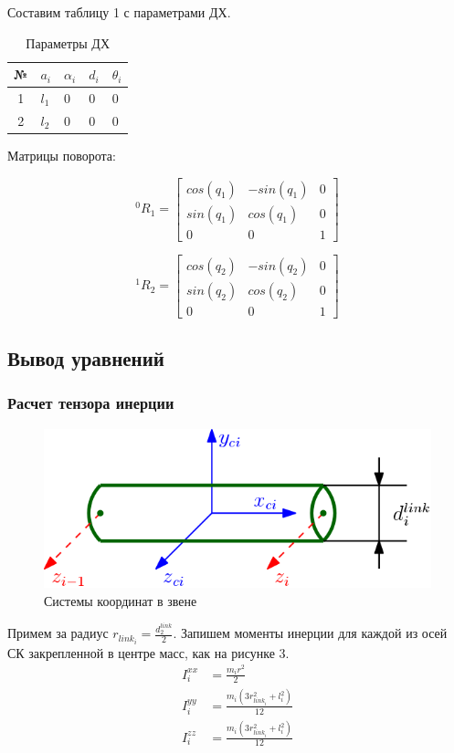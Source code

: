 \documentclass[a4paper,14pt]{extreport}
\begin{document}
Составим таблицу 1 с параметрами ДХ.

\begin{table}[H]
	\centering
	\caption{Параметры ДХ}
	\label{my-label}
	\begin{tabular}{|c|l|l|l|l|}
		\hline
		№ & $a_i$ & $\alpha_i$ & $d_i$ & $\theta_i$ \\ \hline
		1 & $l_1$ & 0 & 0 & 0 \\ \hline
		2 & $l_2$ & 0 & 0 & 0 \\ \hline
	\end{tabular}
\end{table}

Матрицы поворота:

\begin{equation}
	^0R_1 =
	\begin{bmatrix}
		cos(q_1) & -sin(q_1) & 0\\
		sin(q_1)& cos(q_1) &0 \\
		0&0 &1
	\end{bmatrix}
\end{equation}

\begin{equation}
	^1R_2 =
	\begin{bmatrix}
	cos(q_2) & -sin(q_2) & 0\\
	sin(q_2)& cos(q_2) &0 \\
	0&0 &1
	\end{bmatrix}
\end{equation}


\subsection{Вывод уравнений}

\subsubsection{Расчет тензора инерции}

\begin{figure}[H]
	\center\includegraphics[width=0.8\linewidth]{images/3.png}
	\caption{Системы координат в звене}
	\label{fig:scr1}
\end{figure}
Примем за радиус $r_{link_i} = \frac{d^{link}_2}{2}$. Запишем моменты инерции для каждой из осей СК закрепленной в центре масс, как на рисунке 3. 
\begin{align}
	I_i^{xx} &= \frac{m_i r^2}{2} \\
	I_i^{yy} &= \frac{m_i (3 r_{link_i}^2 + l_i^2)}{12} \\
	I_i^{zz} &= \frac{m_i (3 r_{link_i}^2 + l_i^2)}{12}
\end{align}
\end{document}
